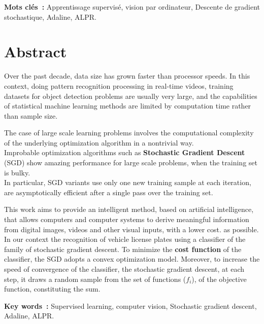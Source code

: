 	\begin{center}
		
	\end{center}
	\textbf{Mots clés~:} Apprentissage supervisé, vision par ordinateur, Descente de gradient stochastique, Adaline, ALPR. 

\endgroup			

\vfill

\pagebreak




\begingroup
\let\clearpage\relax
\let\cleardoublepage\relax
\let\cleardoublepage\relax

\chapter*{Abstract}
	Over the past decade, data size has grown faster than processor speeds. In this context, doing pattern recognition processing in real-time videos, training datasets for object detection problems are usually very large, and the capabilities of statistical machine learning methods are limited by computation time rather than sample size.
	
	The case of large scale learning problems involves the computational complexity of the underlying optimization algorithm in a nontrivial way.\\
	Improbable optimization algorithms such as \textbf{Stochastic Gradient Descent} (SGD) show amazing performance for large scale problems, when the training set is bulky.\\
	In particular, SGD variants use only one new training sample at each iteration, are asymptotically efficient after a single pass over the training set.
	
	This work aims to provide an intelligent method, based on artificial intelligence, that allows computers and computer systems to derive meaningful information from digital images, videos and other visual inputs, with a lower cost. as possible. In our context the recognition of vehicle license plates using a classifier of the family of stochastic gradient descent. To minimize the \textbf{cost function} of the classifier, the SGD adopts a convex optimization model. Moreover, to increase the speed of convergence of the classifier, the stochastic gradient descent, at each step, it draws a random sample from the set of functions ($f_i$), of the objective function, constituting the sum.
	
	\begin{center}
		
	\end{center}
	\textbf{Key words~:} Supervised learning, computer vision, Stochastic gradient descent, Adaline, ALPR.

	

\endgroup			

\vfill